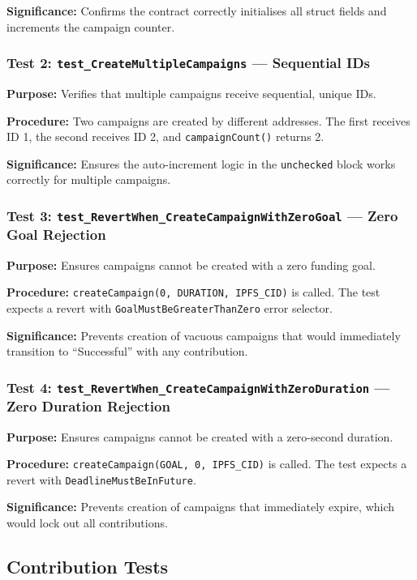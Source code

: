 \textbf{Significance:} Confirms the contract correctly initialises all struct fields and increments the campaign counter.

\subsubsection{Test 2: \texttt{test\_CreateMultipleCampaigns} --- Sequential IDs}

\textbf{Purpose:} Verifies that multiple campaigns receive sequential, unique IDs.

\textbf{Procedure:} Two campaigns are created by different addresses. The first receives ID 1, the second receives ID 2, and \texttt{campaignCount()} returns 2.

\textbf{Significance:} Ensures the auto-increment logic in the \texttt{unchecked} block works correctly for multiple campaigns.

\subsubsection{Test 3: \texttt{test\_RevertWhen\_CreateCampaignWithZeroGoal} --- Zero Goal Rejection}

\textbf{Purpose:} Ensures campaigns cannot be created with a zero funding goal.

\textbf{Procedure:} \texttt{createCampaign(0, DURATION, IPFS\_CID)} is called. The test expects a revert with \texttt{GoalMustBeGreaterThanZero} error selector.

\textbf{Significance:} Prevents creation of vacuous campaigns that would immediately transition to ``Successful'' with any contribution.

\subsubsection{Test 4: \texttt{test\_RevertWhen\_CreateCampaignWithZeroDuration} --- Zero Duration Rejection}

\textbf{Purpose:} Ensures campaigns cannot be created with a zero-second duration.

\textbf{Procedure:} \texttt{createCampaign(GOAL, 0, IPFS\_CID)} is called. The test expects a revert with \texttt{DeadlineMustBeInFuture}.

\textbf{Significance:} Prevents creation of campaigns that immediately expire, which would lock out all contributions.

\subsection{Contribution Tests}

